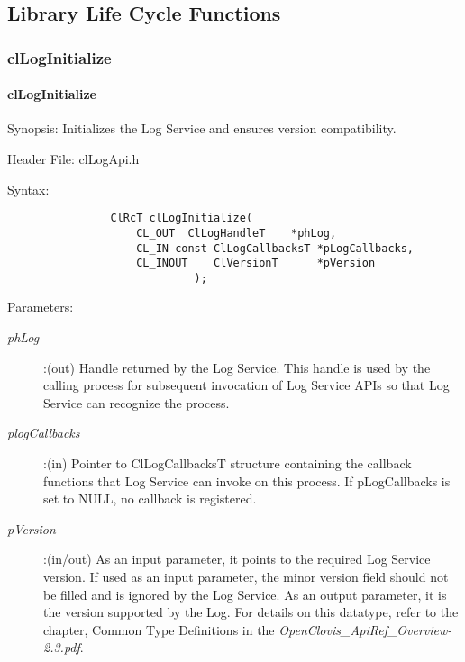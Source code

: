 \begin{flushleft}
\newpage
\section{Library Life Cycle Functions}
\subsubsection{clLogInitialize}
\hypertarget{pagelog101}{}\paragraph{cl\-Log\-Initialize}\label{pagelog101}
\begin{Desc}
\item[Synopsis:]Initializes the Log Service and ensures version compatibility.\end{Desc}
\begin{Desc}
\item[Header File:] clLogApi.h \end{Desc}
\begin{Desc}
\item[Syntax:]

\footnotesize\begin{verbatim}       
				ClRcT clLogInitialize(
					CL_OUT	ClLogHandleT	*phLog,
					CL_IN const ClLogCallbacksT	*pLogCallbacks,
					CL_INOUT	ClVersionT		*pVersion
						     );
\end{verbatim}
\normalsize
\end{Desc}
\begin{Desc}
\item[Parameters:] \begin{description}
\item[{\em phLog}]:(out) Handle returned by the Log Service. This handle is used by the calling process for subsequent invocation of Log Service APIs
so that Log Service can recognize the process.
\item[{\em plogCallbacks}]:(in) 
Pointer to ClLogCallbacksT structure containing the callback functions that Log Service can invoke on this process. If pLogCallbacks is set to 
NULL, no callback is registered. 
\item[{\em pVersion}]:(in/out) As an input parameter, it points to the required Log Service version. 
If used as an input parameter, the minor version field should not be filled and is ignored by the Log Service. As an output parameter, it is the version 
supported by the Log. For details on this datatype, refer to the chapter, Common Type Definitions in the \textit{OpenClovis\_\-ApiRef\_\-Overview-2.3.pdf}.


\end{description}
\end{Desc}
\end{flushleft}
